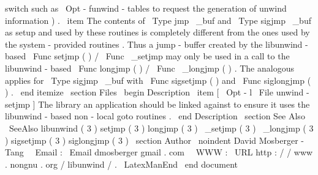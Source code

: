 switch
such
as
\
Opt
{
-
funwind
-
tables
}
to
request
the
generation
of
unwind
information
)
.
\
item
The
contents
of
\
Type
{
jmp
\
_buf
}
and
\
Type
{
sigjmp
\
_buf
}
as
setup
and
used
by
these
routines
is
completely
different
from
the
ones
used
by
the
system
-
provided
routines
.
Thus
a
jump
-
buffer
created
by
the
libunwind
-
based
\
Func
{
setjmp
}
(
)
/
\
Func
{
\
_setjmp
}
may
only
be
used
in
a
call
to
the
libunwind
-
based
\
Func
{
longjmp
}
(
)
/
\
Func
{
\
_longjmp
}
(
)
.
The
analogous
applies
for
\
Type
{
sigjmp
\
_buf
}
with
\
Func
{
sigsetjmp
}
(
)
and
\
Func
{
siglongjmp
}
(
)
.
\
end
{
itemize
}
\
section
{
Files
}
\
begin
{
Description
}
\
item
[
\
Opt
{
-
l
}
\
File
{
unwind
-
setjmp
}
]
The
library
an
application
should
be
linked
against
to
ensure
it
uses
the
libunwind
-
based
non
-
local
goto
routines
.
\
end
{
Description
}
\
section
{
See
Also
}
\
SeeAlso
{
libunwind
(
3
)
}
setjmp
(
3
)
longjmp
(
3
)
\
_setjmp
(
3
)
\
_longjmp
(
3
)
sigsetjmp
(
3
)
siglongjmp
(
3
)
\
section
{
Author
}
\
noindent
David
Mosberger
-
Tang
\
\
Email
:
\
Email
{
dmosberger
gmail
.
com
}
\
\
WWW
:
\
URL
{
http
:
/
/
www
.
nongnu
.
org
/
libunwind
/
}
.
\
LatexManEnd
\
end
{
document
}
